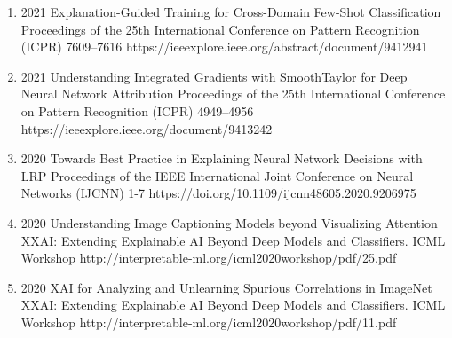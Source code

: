 {\begin{enumerate}
        \item {}
                                {2021}
                                {Explanation-Guided Training for Cross-Domain Few-Shot Classification}
                                {Proceedings of the 25th International Conference on Pattern Recognition (ICPR)}
                                {7609--7616}
                                {https://ieeexplore.ieee.org/abstract/document/9412941}

        \item {}
                                {2021}
                                {Understanding Integrated Gradients with SmoothTaylor for Deep Neural Network Attribution}
                                {Proceedings of the 25th International Conference on Pattern Recognition (ICPR)}
                                {4949--4956}
                                {https://ieeexplore.ieee.org/document/9413242}

        \item {}
                                {2020}
                                {Towards Best Practice in Explaining Neural Network Decisions with LRP}
                                {Proceedings of the IEEE International Joint Conference on Neural Networks (IJCNN)}
                                {1-7}
                                {https://doi.org/10.1109/ijcnn48605.2020.9206975}

        \item {}
                                {2020}
                                {Understanding Image Captioning Models beyond Visualizing Attention}
                                {XXAI: Extending Explainable AI Beyond Deep Models and Classifiers. ICML Workshop}
                                {}
                                {http://interpretable-ml.org/icml2020workshop/pdf/25.pdf}


        \item {}
                                {2020}
                                {XAI for Analyzing and Unlearning Spurious Correlations in ImageNet}
                                {XXAI: Extending Explainable AI Beyond Deep Models and Classifiers. ICML Workshop}
                                {}
                                {http://interpretable-ml.org/icml2020workshop/pdf/11.pdf}



\end{enumerate}}
